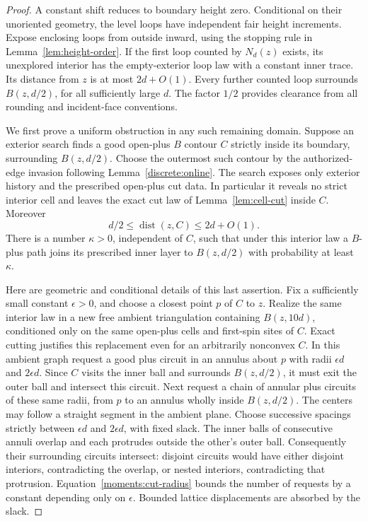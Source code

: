 \documentclass[11pt]{article}
\theoremstyle{definition}
\theoremstyle{remark}
\numberwithin{equation}{section}
\begin{document}
\begin{proof}
A constant shift reduces to boundary height zero.  Conditional on their
unoriented geometry, the level loops have independent fair height
increments.  Expose enclosing loops from outside inward, using the
stopping rule in Lemma~\ref{lem:height-order}.  If the first loop counted
by $N_d(z)$ exists, its unexplored interior has the empty-exterior loop
law with a constant inner trace.  Its distance from $z$ is at most
$2d+O(1)$.  Every further counted loop surrounds $B(z,d/2)$, for all
sufficiently large $d$.  The factor $1/2$ provides clearance from all
rounding and incident-face conventions.

We first prove a uniform obstruction in any such remaining domain.
Suppose an exterior search finds a good open-plus $B$ contour $C$ strictly
inside its boundary, surrounding $B(z,d/2)$.  Choose the outermost such
contour by the authorized-edge invasion following
Lemma~\ref{discrete:online}.  The search exposes only exterior
history and the prescribed open-plus cut data.  In particular it reveals
no strict interior cell and leaves the exact cut law of
Lemma~\ref{lem:cell-cut} inside $C$.  Moreover
\begin{equation}\label{moments:cut-radius}
 d/2\leq\operatorname{dist}(z,C)\leq2d+O(1).
\end{equation}
There is a number $\kappa>0$, independent of $C$, such that under this
interior law a $B$-plus path joins its prescribed inner layer to
$B(z,d/2)$ with probability at least $\kappa$.

Here are geometric and conditional details of this last assertion.
Fix a sufficiently small constant $\epsilon>0$, and choose a closest
point $p$ of $C$ to $z$.  Realize the same interior law in a new free
ambient triangulation containing $B(z,10d)$, conditioned only on the
same open-plus cells and first-spin sites of $C$.  Exact cutting
justifies this replacement even for an arbitrarily nonconvex $C$.
In this ambient graph request a good plus circuit in an annulus about
$p$ with radii $\epsilon d$ and $2\epsilon d$.  Since $C$ visits the
inner ball and surrounds $B(z,d/2)$, it must exit the outer ball and
intersect this circuit.  Next request a chain of annular plus circuits
of these same radii, from $p$ to an annulus wholly inside $B(z,d/2)$.
The centers may follow a straight segment in the ambient plane.  Choose
successive spacings strictly between $\epsilon d$ and $2\epsilon d$,
with fixed slack.  The inner balls of consecutive annuli overlap and
each protrudes outside the other's outer ball.  Consequently their
surrounding circuits intersect: disjoint circuits would have either
disjoint interiors, contradicting the overlap, or nested interiors,
contradicting that protrusion.  Equation~\eqref{moments:cut-radius}
bounds the number of requests by a constant depending only on
$\epsilon$.  Bounded lattice displacements are absorbed by the slack.


\end{proof}
\end{document}
